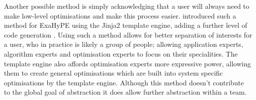 \cite{templateExahype}
Another possible method is simply acknowledging that a user will always need to make low-level optimisations and make this process easier.
\citeauthor{templateExahype} introduced such a method for ExaHyPE using the Jinja2 template engine, adding a further level of code generation \cite{templateExahype}.
Using such a method allows for better separation of interests for a user, who in practice is likely a group of people; allowing application experts, algorithm experts and optimisation experts \cite[defined within]{templateExahype} to focus on their specialities.
The template engine also affords optimisation experts more expressive power, allowing them to create general optimisations which are built into system specific optimisations by the template engine. 
Although this method doesn't contribute to the global goal of abstraction it does allow further abstraction within a team. 



\cite{YATeTo}

\cite{FiredrakeAndCOFFEE}


\cite{codegen_dg_SIMD}

